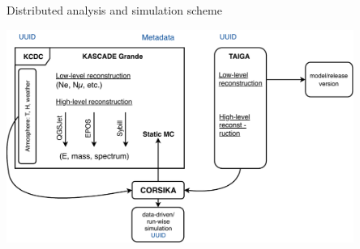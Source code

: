 \documentclass[18pt]{beamer}
\begin{document}
\begin{frame}{Distributed analysis and simulation scheme}
\vspace{-1em}
\begin{center}
\includegraphics[width=0.85\textwidth]{pics/kcdc_scheme_k.pdf}
\end{center}
\end{frame}

%
%

\end{document}
